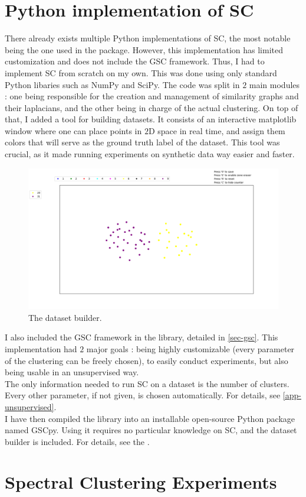 \documentclass[a4paper,12pt]{article}
\theoremstyle{definition}
\theoremstyle{plain}
\begin{document}
\section{Python implementation of SC}
There already exists multiple Python implementations of SC, the most notable being the one used in the \cite[scikit learn]{scikit} package. However, this implementation has limited customization and does not include the GSC framework. Thus, I had to implement SC from scratch on my own. This was done using only standard Python libaries such as NumPy and SciPy. The code was split in $2$ main modules : one being responsible for the creation and management of similarity graphs and their laplacians, and the other being in charge of the actual clustering. On top of that, I added a tool for building datasets. It consists of an interactive matplotlib window where one can place points in $2$D space in real time, and assign them colors that will serve as the ground truth label of the dataset. This tool was crucial, as it made running experiments on synthetic data way easier and faster.
\begin{figure}[H]
	\centering
	\includegraphics[width=0.6\linewidth]{figures/dataset_builder}
	\caption{The dataset builder.}
	\label{fig:dataset_builder}
\end{figure}
I also included the GSC framework in the library, detailed in \ref{sec-gsc}. This implementation had $2$ major goals : being highly customizable (every parameter of the clustering can be freely chosen), to easily conduct experiments, but also being usable in an unsupervised way. \\
The only information needed to run SC on a dataset is the number of clusters. Every other parameter, if not given, is chosen automatically. For details, see \ref{app-unsupervised}. \\
I have then compiled the library into an installable open-source Python package named GSCpy. Using it requires no particular knowledge on SC, and the dataset builder is included. For details, see the \cite[GSCpy github repository]{github}.
\section{Spectral Clustering Experiments} \label{sec-exp}
\end{document}
